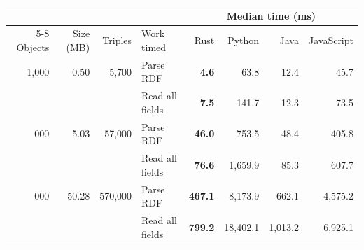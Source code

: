 \begin{tabular*}{\linewidth}{@{\extracolsep{\fill}}rrrlrrrr@{}}
\toprule
& & & & \multicolumn{4}{c}{Median time (ms)} \\
\cmidrule(l){5-8}
Objects & Size (MB) & Triples & Work timed & Rust & Python & Java & JavaScript \\
\midrule
1{,}000 & 0.50 & 5{,}700 & Parse RDF & \textbf{4.6} & 63.8 & 12.4 & 45.7 \\
 &  &  & Read all fields & \textbf{7.5} & 141.7 & 12.3 & 73.5 \\
\addlinespace
10{,}000 & 5.03 & 57{,}000 & Parse RDF & \textbf{46.0} & 753.5 & 48.4 & 405.8 \\
 &  &  & Read all fields & \textbf{76.6} & 1{,}659.9 & 85.3 & 607.7 \\
\addlinespace
100{,}000 & 50.28 & 570{,}000 & Parse RDF & \textbf{467.1} & 8{,}173.9 & 662.1 & 4{,}575.2 \\
 &  &  & Read all fields & \textbf{799.2} & 18{,}402.1 & 1{,}013.2 & 6{,}925.1 \\
\bottomrule
\end{tabular*}
